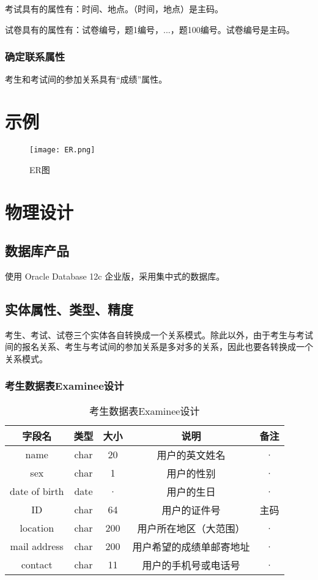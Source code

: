 考试具有的属性有：时间、地点。（时间，地点）是主码。

试卷具有的属性有：试卷编号，题1编号，...，题100编号。试卷编号是主码。

\subsubsection{确定联系属性}
考生和考试间的参加关系具有“成绩”属性。

\section{示例}
\begin{figure}[ht]
\centering
\texttt{[image: ER.png]}
\caption{ER图} \label{fig:figure1}
\end{figure}



\section{物理设计}

\subsection{数据库产品}
使用 Oracle Database 12c 企业版，采用集中式的数据库。

\subsection{实体属性、类型、精度}
考生、考试、试卷三个实体各自转换成一个关系模式。除此以外，由于考生与考试间的报名关系、考生与考试间的参加关系是多对多的关系，因此也要各转换成一个关系模式。
\subsubsection{考生数据表Examinee设计}
\begin{table}[htbp]
\centering
\caption{考生数据表Examinee设计} \label{tab:client-database}
\begin{tabular}{|c|c|c|c|c|}
    \hline
    字段名 & 类型 & 大小 & 说明 & 备注 \\
    \hline
    name & char & 20 & 用户的英文姓名 & · \\
    \hline
    sex & char & 1 & 用户的性别 & · \\
    \hline
    date of birth & date & · & 用户的生日 & · \\
    \hline
    ID & char & 64 & 用户的证件号 & 主码 \\
    \hline
    location & char & 200 & 用户所在地区（大范围） & · \\
    \hline
    mail address & char & 200 & 用户希望的成绩单邮寄地址 & · \\
    \hline
    contact & char & 11 & 用户的手机号或电话号 & · \\
    \hline
\end{tabular}
\end{table}

